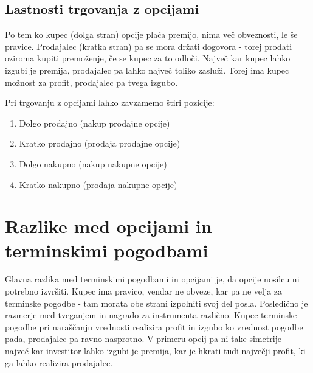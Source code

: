 \documentclass[a4paper]{article}
\begin{document}
\subsection{Lastnosti trgovanja z opcijami}
Po tem ko kupec (dolga stran) opcije plača premijo, nima več obveznosti, le še pravice. Prodajalec (kratka stran) pa se mora držati dogovora - torej prodati
oziroma kupiti premoženje, če se kupec za to odloči. Največ kar kupec lahko izgubi je premija,
prodajalec pa lahko največ toliko zasluži. Torej ima kupec možnost za profit, prodajalec pa tvega izgubo.

Pri trgovanju z opcijami lahko zavzamemo štiri pozicije:
\begin{enumerate}
    \item Dolgo prodajno (nakup prodajne opcije)
    \item Kratko prodajno (prodaja prodajne opcije)
    \item Dolgo nakupno (nakup nakupne opcije)
    \item Kratko nakupno (prodaja nakupne opcije)
\end{enumerate}

\section{Razlike med opcijami in terminskimi pogodbami}
Glavna razlika med terminskimi pogodbami in opcijami je, da opcije nosilcu ni potrebno izvršiti. Kupec ima pravico,
vendar ne obveze, kar pa ne velja za terminske pogodbe - tam morata obe strani izpolniti svoj del posla.
Posledično je razmerje med tveganjem in nagrado za instrumenta različno. Kupec terminske pogodbe pri naraščanju vrednosti
realizira profit in izgubo ko vrednost pogodbe pada, prodajalec pa ravno nasprotno. V primeru
opcij pa ni take simetrije - največ kar investitor lahko izgubi je premija, kar je hkrati tudi največji profit, ki ga lahko realizira prodajalec.
\end{document}
